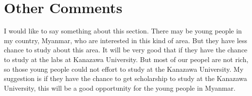 \section*{Other Comments}
I would like to say something about this section. There may be young people in my country, Myanmar, who are interested in this kind of area. But they have less chance to study about this area. It will be very good that if they have the chance to study at the labs at Kanazawa University. But most of our peopel are not rich, so those young people could not effort to study at the Kanazawa University. My suggestion is if they have the chance to get scholarship to study at the Kanazawa University, this will be a good opportunity for the young people in Myanmar.